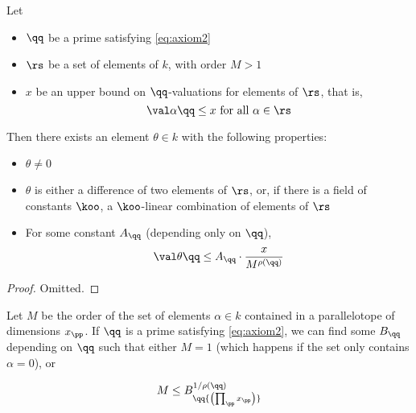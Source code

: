 \begin{lemma}
  \label{thm:thetaexists}
  Let
  \begin{itemize}
  \item $\qq$ be a prime satisfying \ref{eq:axiom2}
  \item $\rs$ be a set of elements of $k$, with order $M>1$
  \item $x$ be an upper bound on $\qq$-valuations for elements of $\rs$, that is,
    \[ \val\alpha\qq \leq x \text{ for all } \alpha\in\rs \]
  \end{itemize}
  Then there exists an element $\theta\in k$ with the following properties:
  \begin{itemize}
  \item $\theta\neq 0$
  \item $\theta$ is either a difference of two elements of $\rs$, or, if there
    is a field of constants $\koo$, a $\koo$-linear combination of elements of $\rs$
  \item For some constant $A_\qq$ (depending only on $\qq$),
    \[ \val\theta\qq \leq A_\qq \cdot \frac x{M^{\rho(\qq)}} \]
  \end{itemize}
\end{lemma}

\begin{proof}
  Omitted.


\end{proof}

\begin{lemma}
  Let $M$ be the order of the set of elements $\alpha\in k$ contained in a
  parallelotope of dimensions $x_\pp$. If $\qq$ is a prime satisfying
  \ref{eq:axiom2}, we can find some $B_\qq$ depending on $\qq$ such that either
  $M = 1$ (which happens if the set only contains $\alpha=0$), or

  \[ M \leq B_\qq  {\left( \prod_\pp x_\pp \right)} ^{1/\rho(\qq)} \]
\end{lemma}

